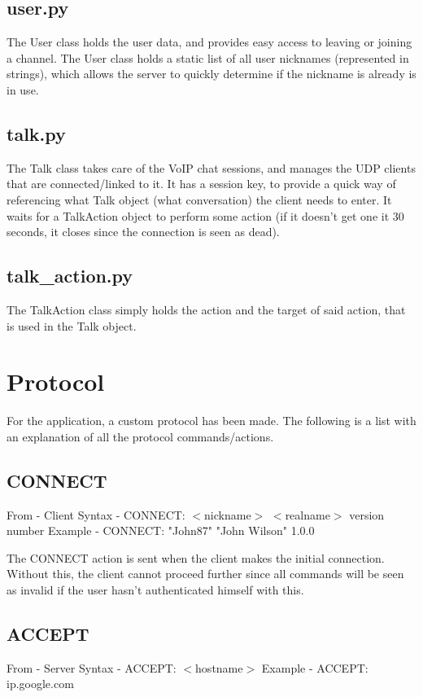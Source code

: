 \documentclass[12pt]{rapport}
\begin{document}
\subsection*{user.py}
The User class holds the user data, and provides easy access to
leaving or joining a channel. The User class holds a static list of
all user nicknames (represented in strings), which allows the server
to quickly determine if the nickname is already is in use.

\subsection*{talk.py}
The Talk class takes care of the VoIP chat sessions, and manages the
UDP clients that are connected/linked to it. It has a session key, to
provide a quick way of referencing what Talk object (what
conversation) the client needs to enter. It waits for a TalkAction
object to perform some action (if it doesn't get one it 30 seconds, it
closes since the connection is seen as dead).

\subsection*{talk\_action.py}
The TalkAction class simply holds the action and the target of said
action, that is used in the Talk object.


\section*{Protocol}
For the application, a custom protocol has been made. The following is
a list with an explanation of all the protocol commands/actions.

\subsection*{CONNECT}
From    - Client\newline
Syntax  - CONNECT: $<$nickname$>$ $<$realname$>$ version number\newline
Example - CONNECT: "John87" "John Wilson" 1.0.0\newline

\noindent The CONNECT action is sent when the client makes the initial
connection. Without this, the client cannot proceed further since all
commands will be seen as invalid if the user hasn't authenticated
himself with this.

\subsection*{ACCEPT}
From    - Server\newline
Syntax  - ACCEPT: $<$hostname$>$\newline
Example - ACCEPT: ip.google.com\newline
\end{document}

